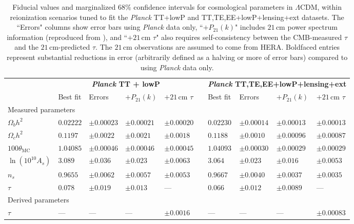 \documentclass[twocolumn,aps,prd,nofootinbib,showpacs,superscriptaddress]{revtex4-1}
\begin{document}
\begin{table}
\caption{\label{tab:CosmoParams} Fiducial values and marginalized $68\%$ confidence intervals for cosmological parameters in $\Lambda$CDM, within reionization scenarios tuned to fit the \emph{Planck} TT+lowP and TT,TE,EE+lowP+lensing+ext datasets. The ``Errors" columns show error bars using \emph{Planck} data only, ``$+P_{21} (k)$" includes $21\,\textrm{cm}$ power spectrum information (reproduced from \cite{Liu_in_prep}), and ``$+21\,\textrm{cm}$ $\tau$" also requires self-consistency between the CMB-measured $\tau$ and the $21\,\textrm{cm}$-predicted $\tau$. The $21\,\textrm{cm}$ observations are assumed to come from HERA. Boldfaced entries represent substantial reductions in error (arbitrarily defined as a halving or more of error bars) compared to using \emph{Planck} data only.}
\begin{ruledtabular}
\begin{tabular}{lllllcllll}
 & \multicolumn{4}{c}{\textbf{\emph{Planck} TT + lowP}} && \multicolumn{4}{l}{\textbf{ \emph{Planck} TT,TE,EE+lowP+lensing+ext}  } \\
 & Best fit & Errors &  $+P_{21} (k)$ &$+21\,\textrm{cm}$ $\tau$&& Best fit & Errors &  $+P_{21} (k)$ &  $+21\,\textrm{cm}$ $\tau$\\
\hline
\multicolumn{7}{l}{Measured parameters} \\
$\Omega_b h^2$ \dotfill & $0.02222 $&$ \pm 0.00023$ & $\pm 0.00021$ &  $\pm 0.00020$ && $0.02230 $&$\pm 0.00014$ & $\pm 0.00013$ &  $\pm 0.00013$ \\
$\Omega_c h^2$ \dotfill & $0.1197$&$ \pm 0.0022$  & $\pm 0.0021$ &  $\pm 0.0018$ && $0.1188$&$ \pm 0.0010$ & $\pm 0.00096$ &  $\pm 0.00087$ \\
$100 \theta_\textrm{MC}$\dotfill  & $1.04085 $&$\pm 0.00046$ & $\pm 0.00046$ &  $\pm 0.00045$ & &$1.04093 $&$\pm 0.00030$ & $\pm 0.00029$ & $\pm 0.00029$ \\
$\ln ( 10^{10} A_s) $ \dotfill & $3.089 $&$\pm 0.036$ & $\pm 0.023$ &  $\mathbf{\pm 0.0063}$ & &$3.064$&$ \pm 0.023$ & $\pm 0.016$ & $\mathbf{\pm 0.0053}$  \\
$ n_s $\dotfill  & $ 0.9655$&$ \pm 0.0062$ & $\pm 0.0057$ &  $\pm 0.0053$ && $0.9667$&$ \pm 0.0040$ & $\pm 0.0037$ &  $\pm 0.0035$ \\
$ \tau $ \dotfill & $0.078 $&$\pm 0.019$ & $\pm 0.013$ &  ---  && $0.066 $&$\pm 0.012$ & $\pm 0.0089$ &  --- \\
\hline
\multicolumn{7}{l}{Derived parameters} \\
$ \tau $\dotfill  & --- & ---  & --- & $ \mathbf{\pm 0.0016}$ &&---  & ---  & ---& $ \mathbf{\pm 0.00083}$ \\

\end{tabular}
\end{ruledtabular}
\end{table}
\end{document}
